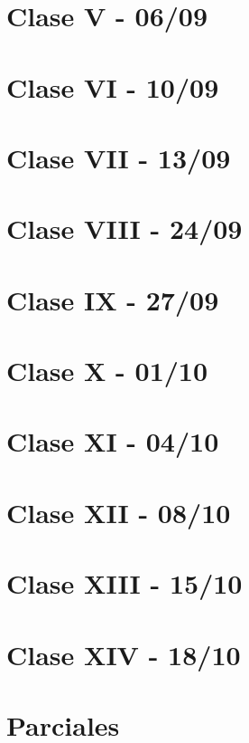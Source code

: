 \documentclass[12pt,a4paper]{book}
\begin{document}
\chapter{Clase V - 06/09}

\newpage\thispagestyle{empty}\blankpage

\chapter{Clase VI - 10/09}

\newpage\thispagestyle{empty}\blankpage

\chapter{Clase VII - 13/09}

\newpage\thispagestyle{empty}\blankpage

\chapter{Clase VIII - 24/09}

\newpage\thispagestyle{empty}\blankpage

\chapter{Clase IX - 27/09}

\newpage\thispagestyle{empty}\blankpage

\chapter{Clase X - 01/10}

\newpage\thispagestyle{empty}\blankpage

\chapter{Clase XI - 04/10}

\newpage\thispagestyle{empty}\blankpage

\chapter{Clase XII - 08/10}

\newpage\thispagestyle{empty}\blankpage

\chapter{Clase XIII - 15/10}

\newpage\thispagestyle{empty}\blankpage

\chapter{Clase XIV - 18/10}

\newpage\thispagestyle{empty}\blankpage


\chapter{Parciales}


\blankpage



\nocite{*}
\end{document}
